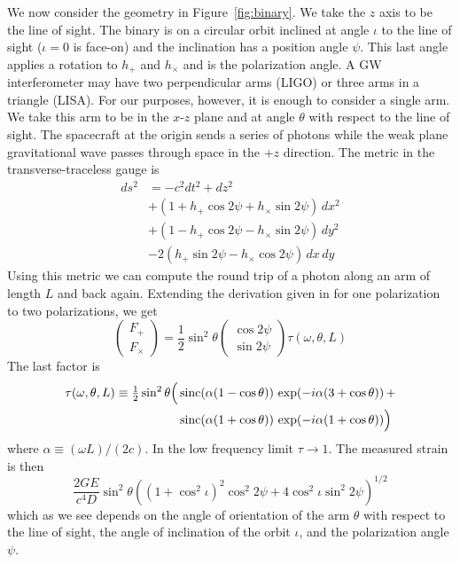 \documentclass[10pt,a4paper]{article}
\def\sinc{\mathop{\rm sinc}\nolimits}
\begin{document}
We now consider the geometry in Figure~\ref{fig:binary}.  We take the
$z$ axis to be the line of sight.  The binary is on a circular orbit
inclined at angle $\iota$ to the line of sight ($\iota=0$ is face-on)
and the inclination has a position angle $\psi$.  This last angle
applies a rotation to $h_+$ and $h_\times$ and is the polarization
angle.  A GW interferometer may have two perpendicular arms (LIGO) or
three arms in a triangle (LISA).  For our purposes, however, it is
enough to consider a single arm.  We take this arm to be in the
$x$-$z$ plane and at angle $\theta$ with respect to the line of sight.
The spacecraft at the origin sends a series of photons while the weak
plane gravitational wave passes through space in the $+z$ direction.
The metric in the transverse-traceless gauge is
\begin{equation}
\begin{aligned}
ds^2 &= -c^2 dt^2 + dz^2 \\
&+ (1 + h_+\cos2\psi + h_\times\sin2\psi) \, dx^2 \\
&+ (1 - h_+\cos2\psi - h_\times\sin2\psi) \, dy^2 \\
&- 2(h_+\sin2\psi - h_\times\cos2\psi) \, dx\,dy
\end{aligned}
\end{equation}
Using this metric we can
compute the round trip of a photon along an arm of length $L$ and 
back again.  Extending the derivation given in \cite{cornish} for
one polarization to two polarizations, we get
\begin{equation}
\begin{pmatrix}
  F_+\\F_\times
\end{pmatrix}
= {\textstyle\frac12} \sin^2\theta 
\begin{pmatrix}
  \cos2\psi\\
  \sin2\psi
\end{pmatrix}
\tau(\omega,\theta,L) 
\end{equation}
The last factor is
\begin{equation}
\begin{aligned}
  \tau(\omega,\theta,L) \equiv {\textstyle\frac12} \sin^2\theta
  \Big( &\sinc(\alpha(1-\cos\theta))\,\exp(-i\alpha(3+\cos\theta)) \, + \\
        &\sinc(\alpha(1+\cos\theta))\,\exp(-i\alpha(1+\cos\theta)) \Big)
\end{aligned}  
\end{equation}
where $\alpha\equiv(\omega L)/(2c)$.  In the low frequency limit
$\tau\to1$.  The measured strain is then
\begin{equation}
\frac{2GE}{c^4 D} \sin^2\theta
  \left((1+\cos^2\iota)^2 \cos^2 2\psi + 4\cos^2\iota \sin^2 2\psi\right)^{1/2}
\end{equation}
which as we see depends on the angle of orientation of the arm
$\theta$ with respect to the line of sight, the angle of inclination
of the orbit $\iota$, and the polarization angle $\psi$.
\end{document}

